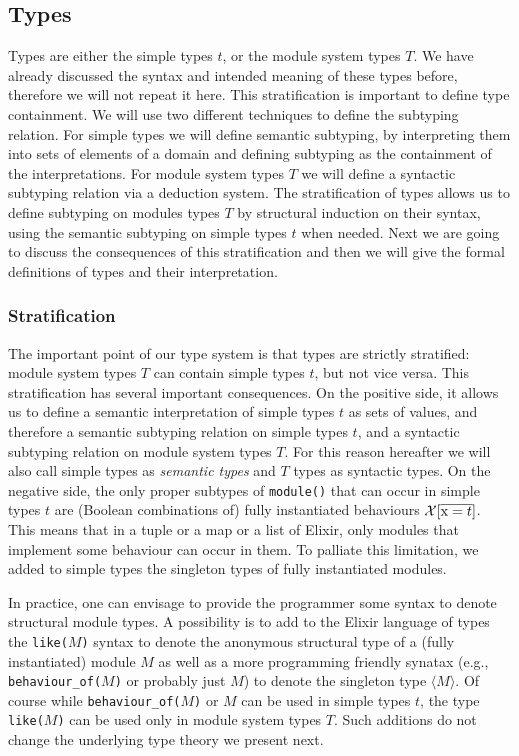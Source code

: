 \documentclass[a4paper,10pt]{article}
\begin{document}
\subsection{Types}

Types are either the simple types $t$, or the module system types $T$. We have already discussed the syntax and intended meaning of these types before, therefore we will not repeat it here. This stratification is important to define type containment. We will use two different techniques to define the subtyping relation. For simple types we will define semantic subtyping, by interpreting them into sets of elements of a domain and defining subtyping as the containment of the interpretations. For module system types $T$ we will define a syntactic subtyping relation via a deduction system. The stratification of types allows us to define subtyping on modules types $T$ by structural induction on their syntax, using the semantic subtyping on simple types $t$ when needed. Next we are going to discuss the consequences of this stratification and then we will give the formal definitions of types and their interpretation.



\subsubsection{Stratification}\label{sec:stratification}

The important point of our type system is that types are strictly stratified: module system types $T$ can contain simple types $t$, but not vice versa. This stratification has several important consequences. On the positive side, it allows us to define a semantic interpretation of simple types $t$ as sets of values, and therefore a semantic subtyping relation on simple types $t$, and a syntactic subtyping relation on module system types $T$. For this reason hereafter we will also call simple types as \emph{semantic types} and $T$ types as syntactic types. On the negative side, the only proper subtypes of \texttt{module()} that can occur in simple types $t$ are (Boolean combinations of) fully instantiated behaviours $\mathcal{X}[\overline{\text{\rm x}=t}]$. This means that in a tuple or a map or a list of Elixir, only modules that implement some behaviour can occur in them. To palliate this limitation, we added to simple types the singleton types of fully instantiated modules. 

\begin{remark}
In practice, one can envisage to provide the programmer some syntax to denote structural module types. A possibility is to add to the Elixir language of types the \texttt{like($M$)} syntax to denote the anonymous structural type of a (fully instantiated) module $M$ as well as a more programming friendly synatax (e.g., \texttt{behaviour\_of($M$)} or probably just $M$) to denote the singleton type $\langle M\rangle$. Of course while \texttt{behaviour\_of($M$)} or $M$ can be used in simple types $t$, the type \texttt{like($M$)} can be used only in module system types $T$. Such additions do not change the underlying type theory we present next.
\end{remark}
\end{document}

